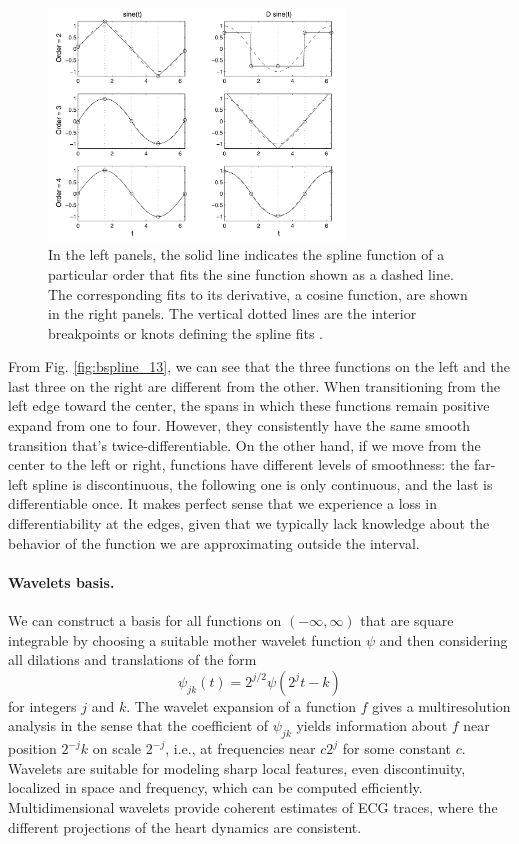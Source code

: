 \begin{figure}
\centering
\includegraphics[width=0.7\textwidth]{Images/bsplines.png}
\caption[Bsplines fitting.]{In the left panels, the solid line indicates the spline function of a particular order that fits the sine function shown as a dashed line. The corresponding fits to its derivative, a cosine function, are shown in the right panels. The vertical dotted lines are the interior breakpoints or knots defining the spline fits \cite{ramsay_functional_2006}.}
\label{fig:bsplines}
\end{figure}
From Fig. \ref{fig:bspline_13}, we can see that the three functions on the left and the last three on the right are different from the other. When transitioning from the left edge toward the center, the spans in which these functions remain positive expand from one to four. However, they consistently have the same smooth transition that's twice-differentiable. On the other hand, if we move from the center to the left or right, functions have different levels of smoothness: the far-left spline is discontinuous, the following one is only continuous, and the last is differentiable once. It makes perfect sense that we experience a loss in differentiability at the edges, given that we typically lack knowledge about the behavior of the function we are approximating outside the interval.
\paragraph{Wavelets basis.} We can construct a basis for all functions on $\left(- \infty, \infty \right)$ that are square integrable by choosing a suitable mother wavelet function $\psi$ and then considering all dilations and translations of the form
\begin{equation}
    \label{eq:wavelet}
    \psi_{j k}(t)=2^{j / 2} \psi\left(2^j t-k\right)
\end{equation}
for integers $j$ and $k$. The wavelet expansion of a function $f$ gives a multiresolution analysis in the sense that the coefficient of $\psi_{jk}$ yields information about $f$ near position $2^{-j}k$ on scale $2^{-j}$, i.e., at frequencies near $c2^j$ for some constant $c$. Wavelets are suitable for modeling sharp local features, even discontinuity, localized in space and frequency, which can be computed efficiently. Multidimensional wavelets provide coherent estimates of ECG traces, where the different projections of the heart dynamics are consistent.
